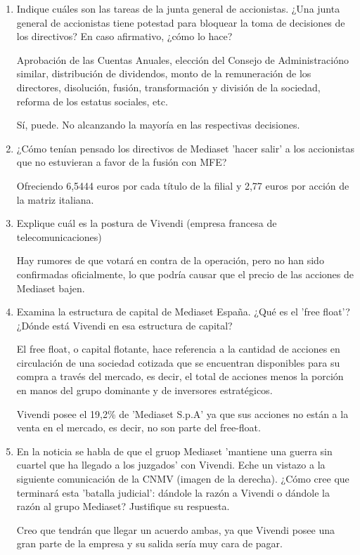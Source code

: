 \documentclass[12pt]{article}
\theoremstyle{definition}
\theoremstyle{remark}
\begin{document}
\begin{enumerate}
\item Indique cuáles son las tareas de la junta general de accionistas. ¿Una junta general de accionistas tiene potestad para bloquear la toma de decisiones de los directivos? En caso afirmativo, ¿cómo lo hace?

Aprobación de las Cuentas Anuales, elección del Consejo de Administracióno similar, distribución de dividendos, monto de la remuneración de los directores, disolución, fusión, transformación y división de la sociedad, reforma de los estatus sociales, etc.

Sí, puede. No alcanzando la mayoría en las respectivas decisiones.

\item ¿Cómo tenían pensado los directivos de Mediaset 'hacer salir' a los accionistas que no estuvieran a favor de la fusión con MFE?

Ofreciendo 6,5444 euros por cada título de la filial y 2,77 euros por acción de la matriz italiana.

\item Explique cuál es la postura de Vivendi (empresa francesa de telecomunicaciones)

Hay rumores de que votará en contra de la operación, pero no han sido confirmadas oficialmente, lo que podría causar que el precio de las acciones de Mediaset bajen.

\item Examina la estructura de capital de Mediaset España. ¿Qué es el 'free float'? ¿Dónde está Vivendi en esa estructura de capital?

El free float, o capital flotante, hace referencia a la cantidad de acciones en circulación de una sociedad cotizada que se encuentran disponibles para su compra a través del mercado, es decir, el total de acciones menos la porción en manos del grupo dominante y de inversores estratégicos.

Vivendi posee el 19,2\% de 'Mediaset S.p.A' ya que sus acciones no están a la venta en el mercado, es decir, no son parte del free-float.

\item En la noticia se habla de que el gruop Mediaset 'mantiene una guerra sin cuartel que ha llegado a los juzgados' con Vivendi. Eche un vistazo a la siguiente comunicación de la CNMV (imagen de la derecha). ¿Cómo cree que terminará esta 'batalla judicial': dándole la razón a Vivendi o dándole la razón al grupo Mediaset? Justifique su respuesta.

Creo que tendrán que llegar un acuerdo ambas, ya que Vivendi posee una gran parte de la empresa y su salida sería muy cara de pagar.
\end{enumerate}
\end{document}
